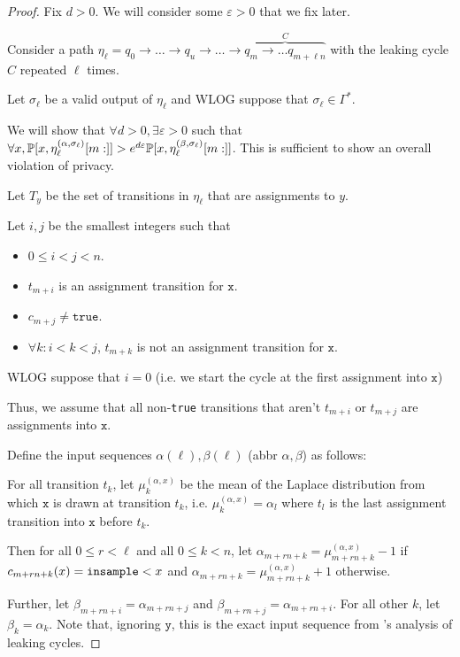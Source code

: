 \begin{proof}
	Fix $d>0$. We will consider some $\varepsilon>0$ that we fix later. 

	Consider a path $\eta_\ell = q_0\to\ldots\to q_u\to \ldots\to \overbrace{q_m\to \ldots q_{m+\ell n}}^{C}$ with the leaking cycle $C$ repeated $\ell$ times.

	Let $\sigma_\ell$ be a valid output of $\eta_\ell$ and WLOG suppose that $\sigma_\ell\in\Gamma^*$.

	We will show that $\forall d>0, \exists \varepsilon>0$ such that $\forall x, \PP[x, \eta_\ell^{(\alpha, \sigma_\ell)}[m:]]>e^{d\varepsilon} \PP[x, \eta_\ell^{(\beta, \sigma_\ell)}[m:]]$. This is sufficient to show an overall violation of privacy. 

	Let $T_y$ be the set of transitions in $\eta_\ell$ that are assignments to $y$. 

	Let $i, j$ be the smallest integers such that \begin{itemize}
		\item $0\leq i <j<n$.
		\item $t_{m+i}$ is an assignment transition for $\texttt{x}$.
		\item $c_{m+j}\neq \texttt{true}$.
		\item $\forall k:i<k<j$, $t_{m+k}$ is not an assignment transition for $\texttt{x}$.
	\end{itemize}

	WLOG suppose that $i=0$ (i.e. we start the cycle at the first assignment into $\texttt{x}$)

	Thus, we assume that all non-\texttt{true} transitions that aren't $t_{m+i}$ or $t_{m+j}$ are assignments into $\texttt{x}$. 

	Define the input sequences $\alpha(\ell), \beta(\ell)$ (abbr $\alpha, \beta$) as follows: 


	For all transition $t_k$, let $\mu_k^{(\alpha, x)}$ be the mean of the Laplace distribution from which $\texttt{x}$ is drawn at transition $t_k$, i.e. $\mu_k^{(\alpha, x)}=\alpha_l$ where $t_l$ is the last assignment transition into $\texttt{x}$ before $t_k$. 

	Then for all $0\leq r < \ell$ and all $0\leq k<n$, let $\alpha_{m+rn+k} = \mu_{m+rn+k}^{(\alpha, x)}-1$ if $c_{m+rn+k}(x) = \lguard[x]$ and $\alpha_{m+rn+k} = \mu_{m+rn+k}^{(\alpha, x)}+1$ otherwise. 

	Further, let $\beta_{m+rn+i} = \alpha_{m+rn+j}$ and $\beta_{m+rn+j}= \alpha_{m+rn+i}$. For all other $k$, let $\beta_k = \alpha_k$. Note that, ignoring $\texttt{y}$, this is the exact input sequence from \cite{chadhaLinearTimeDecidability2021}'s analysis of leaking cycles. 



\end{proof}
